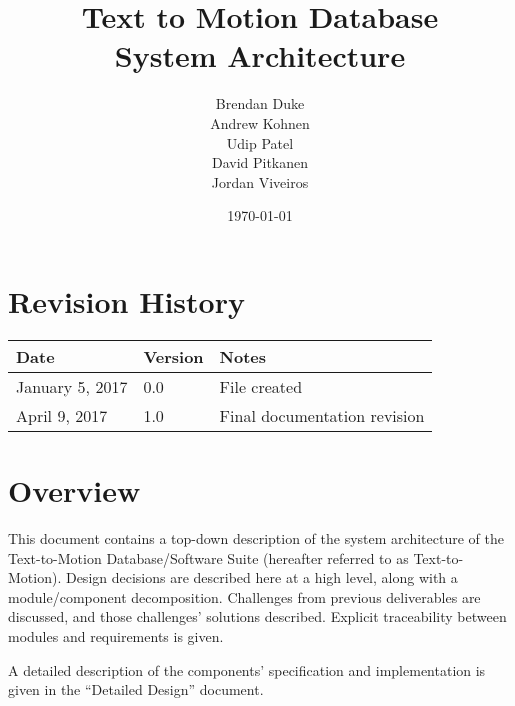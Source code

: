 \documentclass{scrreprt}
\begin{document}
\title{\bf Text to Motion Database\\[\baselineskip]\Large System Architecture}
\author{Brendan Duke\\Andrew Kohnen\\Udip Patel\\David Pitkanen\\Jordan Viveiros}
\date{\today}

\maketitle

\tableofcontents


\chapter*{\bf Revision History}

\begin{table}[bp]
        \begin{tabularx}{\textwidth}{p{3.5cm}p{2cm}X}
                \toprule {\bf Date} & {\bf Version} & {\bf Notes}\\
                \midrule
                January 5, 2017 & 0.0 & File created \\
                April 9, 2017 & 1.0 & Final documentation revision \\
                \bottomrule
        \end{tabularx}
\end{table}

\newpage


\chapter{Overview}

This document contains a top-down description of the system architecture of the
Text-to-Motion Database/Software Suite (hereafter referred to as
Text-to-Motion). Design decisions are described here at a high level, along
with a module/component decomposition. Challenges from previous deliverables
are discussed, and those challenges' solutions described.  Explicit
traceability between modules and requirements is given.

A detailed description of the components' specification and implementation is
given in the ``Detailed Design'' document.
\end{document}
